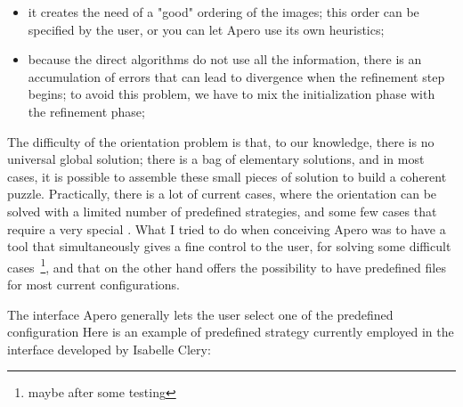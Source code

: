\begin{itemize}
   \item  it creates the need of a "good" ordering of the images;
           this order can be specified by the user, or you can let Apero use its
           own heuristics; 

   \item   because the direct algorithms do not use all the information, there is an accumulation
           of errors that can lead to divergence when the refinement step begins; to avoid
           this problem, we have to mix the initialization phase with the refinement phase;

\end{itemize}



The difficulty of the orientation problem is that, to our knowledge, there is no
universal global solution; there is a bag of elementary solutions, and in most cases,
it is possible to assemble these small pieces of solution to build a coherent puzzle.
Practically, there is a lot of current cases, where the orientation can be solved
with a limited number of predefined strategies, and some few cases that
require a very special . 
What I tried to do when conceiving Apero was to have a tool that simultaneously
gives a fine control to the user, for solving some difficult cases~\footnote{maybe
after some testing}, and that on the other hand offers the possibility to have
predefined files for most current configurations.

The interface  Apero generally lets the user select one of the predefined
configuration  %
Here is an example of predefined strategy currently employed in the
interface developed by Isabelle Clery:





